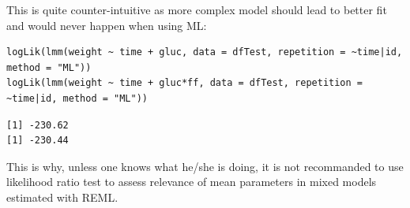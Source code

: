 \documentclass[12pt]{article}
\begin{document}
This is quite counter-intuitive as more complex model should lead to
better fit and would never happen when using ML:
\lstset{language=r,label= ,caption= ,captionpos=b,numbers=none}
\begin{lstlisting}
logLik(lmm(weight ~ time + gluc, data = dfTest, repetition = ~time|id, method = "ML"))
logLik(lmm(weight ~ time + gluc*ff, data = dfTest, repetition = ~time|id, method = "ML"))
\end{lstlisting}

\begin{verbatim}
[1] -230.62
[1] -230.44
\end{verbatim}


This is why, unless one knows what he/she is doing, it is not
recommanded to use likelihood ratio test to assess relevance of mean
parameters in mixed models estimated with REML.

\clearpage
\end{document}
